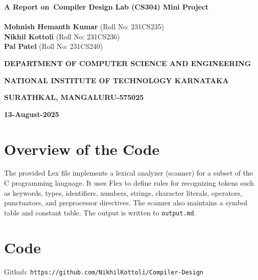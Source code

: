 \documentclass{article}
\begin{document}
\begin{titlepage}
\begin{center}
{\fontsize{22}{26.4}\textbf{A Report on\ Compiler Design Lab (CS304) Mini Project}}\\
\textbf{}\\
{\textbf{Mohnish Hemanth Kumar}} (Roll No: 231CS235)\\
\vspace{0.5cm}
{\textbf{Nikhil Kottoli}} (Roll No: 231CS236)\\
\vspace{0.5cm}
{\textbf{Pal Patel}} (Roll No: 231CS240)\\
\vspace{0.3cm}
\begin{figure}[h]
{\par}
\end{figure}
{\textbf{DEPARTMENT OF COMPUTER SCIENCE AND ENGINEERING}\par}
\vspace{-12pt}
{\textbf{NATIONAL INSTITUTE OF TECHNOLOGY KARNATAKA}\par}
\vspace{-12pt}
{\textbf{SURATHKAL, MANGALURU-575025}\par}
\vspace{-12pt}
{\textbf{13-August-2025}\par}
\end{center}
\pagebreak
\end{titlepage}

\tableofcontents
\newpage

\section{Overview of the Code}
The provided Lex file implements a lexical analyzer (scanner) for a subset of the C programming language. It uses Flex to define rules for recognizing tokens such as keywords, types, identifiers, numbers, strings, character literals, operators, punctuators, and preprocessor directives.  
The scanner also maintains a symbol table and constant table. The output is written to \texttt{output.md}.  
\section{Code}
Github: \texttt{https://github.com/NikhilKottoli/Compiler-Design} \\
\end{document}

